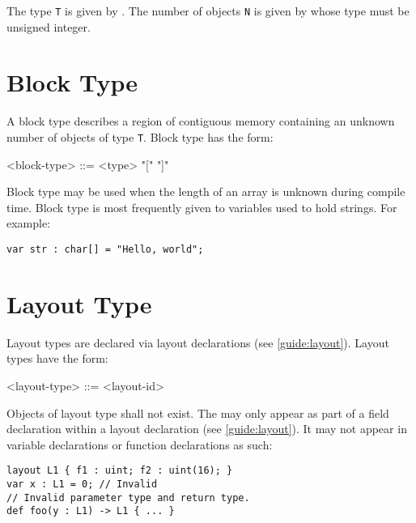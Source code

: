 The type \texttt{T} is given by . The number of objects \texttt{N} is given by  whose type must be unsigned integer.


\section{Block Type} \label{guide:block_type}

A block type describes a region of contiguous memory containing an unknown number of objects of type \texttt{T}. Block type has the form:

\begin{minip}
\begin{grammar}
<block-type> ::= <type> "[" "]"
\end{grammar}
\end{minip}

Block type may be used when the length of an array is unknown during compile time. Block type is most frequently given to variables used to hold strings. For example:

\begin{minip}
\begin{lstlisting}
var str : char[] = "Hello, world";
\end{lstlisting}
\end{minip}

\section{Layout Type} \label{guide:layout_type}

Layout types are declared via layout declarations (see \ref{guide:layout}). Layout types have the form:

\begin{minip}
\begin{grammar}
<layout-type> ::= <layout-id>
\end{grammar}
\end{minip}

Objects of layout type shall not exist. The  may only appear as part of a field declaration within a layout declaration (see \ref{guide:layout}). It may not appear in variable declarations or function declarations as such:

\begin{minip}
\begin{lstlisting}
layout L1 { f1 : uint; f2 : uint(16); }
var x : L1 = 0; // Invalid
// Invalid parameter type and return type.
def foo(y : L1) -> L1 { ... }
\end{lstlisting}
\end{minip}

